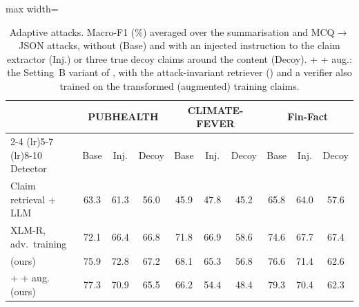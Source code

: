 \begin{table}[t]\centering\small\setlength{\tabcolsep}{5pt}
\begin{adjustbox}{max width=\textwidth}\begin{tabular}{lccccccccc}
\toprule
 & \multicolumn{3}{c}{PUBHEALTH} & \multicolumn{3}{c}{CLIMATE-FEVER} & \multicolumn{3}{c}{Fin-Fact} \\
\cmidrule(lr){2-4} \cmidrule(lr){5-7} \cmidrule(lr){8-10}
Detector & Base & Inj. & Decoy & Base & Inj. & Decoy & Base & Inj. & Decoy \\
\midrule
Claim retrieval + LLM \citep{pikuliak2023multiclaim} & 63.3 & 61.3 & 56.0 & 45.9 & 47.8 & 45.2 & 65.8 & 64.0 & 57.6 \\
XLM-R, adv.\ training \citep{conneau2020xlmr} & 72.1 & 66.4 & 66.8 & 71.8 & 66.9 & 58.6 & 74.6 & 67.7 & 67.4 \\
\method{} (ours) & 75.9 & 72.8 & 67.2 & 68.1 & 65.3 & 56.8 & 76.6 & 71.4 & 62.6 \\
\method{} + \air{} + aug. (ours) & 77.3 & 70.9 & 65.5 & 66.2 & 54.4 & 48.4 & 79.3 & 70.4 & 62.3 \\
\bottomrule
\end{tabular}\end{adjustbox}
\caption{Adaptive attacks. Macro-F1 (\%) averaged over the summarisation and MCQ$\rightarrow$JSON attacks, without (Base) and with an injected instruction to the claim extractor (Inj.) or three true decoy claims around the content (Decoy). \method{} + \air{} + aug.: the Setting~B variant of \method{}, with the attack-invariant retriever (\air{}) and a verifier also trained on the transformed (augmented) training claims.}
\label{tab:adaptive}
\end{table}
